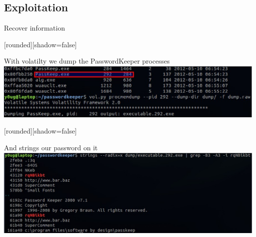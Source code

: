 \documentclass[compress]{beamer}
\begin{document}
\subsection{Exploitation}
\begin{frame}{Recover information}

  [rounded][shadow=false]
  \begin{block}{With volatilty we dump the PasswordKeeper processes}
    \includegraphics[width=\textwidth]{img/passwordkeeper_dump.eps}
  \end{block}

  [rounded][shadow=false]
  \begin{block}{And strings our password on it}
    \includegraphics[width=\textwidth]{img/passwordkeeper_strings.eps}
  \end{block}

\end{frame}
\end{document}
